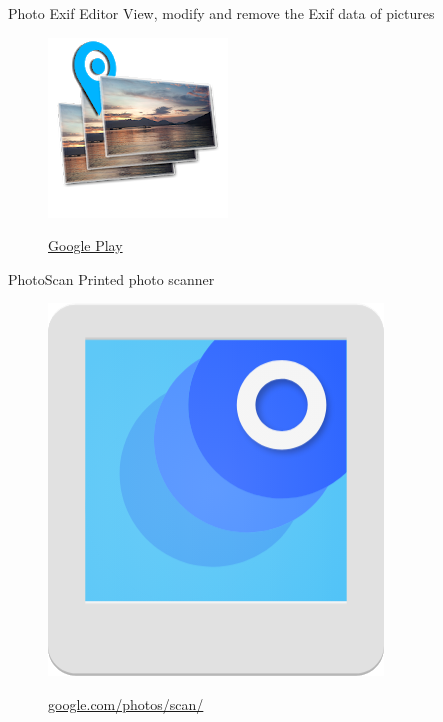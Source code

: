 \documentclass[serif,14pt,color=usenames,dvipsnames]{beamer}
\begin{document}
\begin{frame}{Photo Exif Editor}
View, modify and remove the Exif data of pictures

  \begin{figure}
  \centering
  \includegraphics[width=0.3\linewidth]{imgs/peep}

  \href{https://play.google.com/store/apps/details?id=net.xnano.android.photoexifeditor}{Google
  Play }
  \end{figure}
\end{frame}

\begin{frame}{PhotoScan}
  Printed photo scanner

  \begin{figure}
  \centering
  \includegraphics[width=0.3\linewidth]{imgs/photoscan2}

  \href{https://google.com/photos/scan/}{google.com/photos/scan/}
  \end{figure}
\end{frame}
\end{document}
